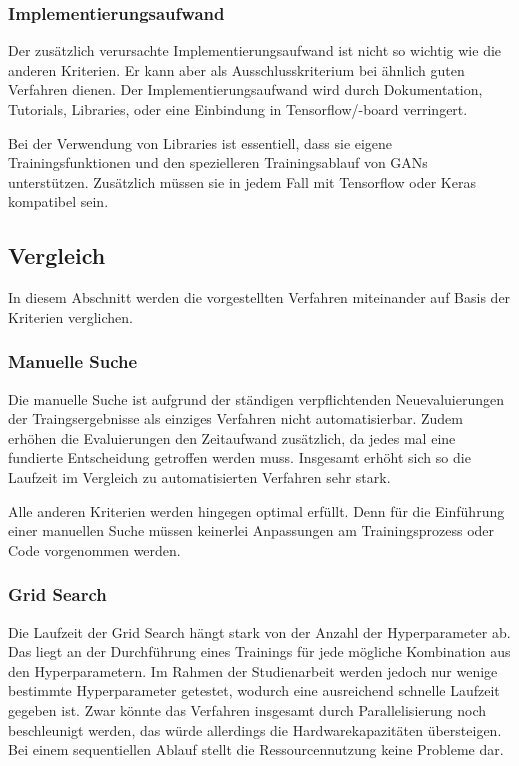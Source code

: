 \subsubsection{Implementierungsaufwand}
Der zusätzlich verursachte Implementierungsaufwand ist nicht so wichtig wie die anderen Kriterien.
Er kann aber als Ausschlusskriterium bei ähnlich guten Verfahren dienen.
Der Implementierungsaufwand wird durch Dokumentation, Tutorials, Libraries, oder eine Einbindung in Tensorflow/-board verringert.

Bei der Verwendung von Libraries ist essentiell, dass sie eigene Trainingsfunktionen und den spezielleren Trainingsablauf von GANs unterstützen.
Zusätzlich müssen sie in jedem Fall mit Tensorflow oder Keras kompatibel sein.

\subsection{Vergleich}
In diesem Abschnitt werden die vorgestellten Verfahren miteinander auf Basis der Kriterien verglichen.

\subsubsection{Manuelle Suche}
Die manuelle Suche ist aufgrund der ständigen verpflichtenden Neuevaluierungen der Traingsergebnisse als einziges Verfahren  nicht automatisierbar.
Zudem erhöhen die Evaluierungen den Zeitaufwand zusätzlich, da jedes mal eine fundierte Entscheidung getroffen werden muss.
Insgesamt erhöht sich so die Laufzeit im Vergleich zu automatisierten Verfahren sehr stark.
\newline

Alle anderen Kriterien werden hingegen optimal erfüllt.
Denn für die Einführung einer manuellen Suche müssen keinerlei Anpassungen am Trainingsprozess oder Code vorgenommen werden.

\subsubsection{Grid Search}
Die Laufzeit der Grid Search hängt stark von der Anzahl der Hyperparameter ab.
Das liegt an der Durchführung eines Trainings für jede mögliche Kombination aus den Hyperparametern.
Im Rahmen der Studienarbeit werden jedoch nur wenige bestimmte Hyperparameter getestet, wodurch eine ausreichend schnelle Laufzeit gegeben ist.
Zwar könnte das Verfahren insgesamt durch Parallelisierung noch beschleunigt werden, das würde allerdings die Hardwarekapazitäten übersteigen.
Bei einem sequentiellen Ablauf stellt die Ressourcennutzung keine Probleme dar.
\newline

